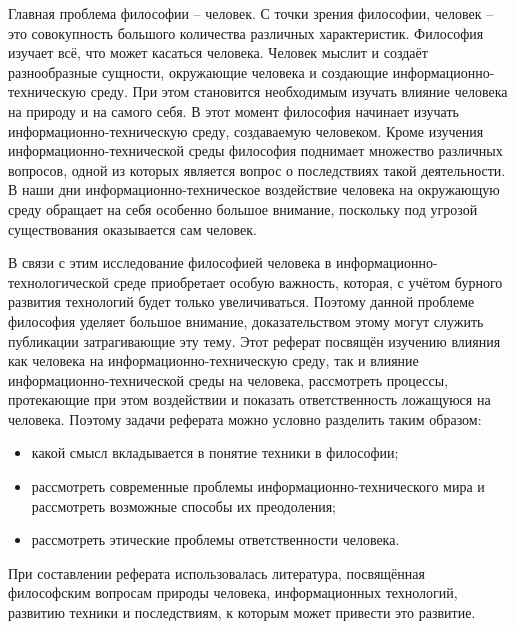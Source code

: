 

Главная проблема философии -- человек. С точки зрения философии, человек -- это совокупность большого количества различных характеристик. Философия изучает всё, что может касаться человека. Человек мыслит и создаёт разнообразные сущности, окружающие человека и создающие информационно-техническую среду. При этом становится необходимым изучать влияние человека на природу и на самого себя. В этот момент философия начинает изучать информационно-техническую среду, создаваемую человеком. Кроме изучения информационно-технической среды философия поднимает множество различных вопросов, одной из которых является вопрос о последствиях такой деятельности. В наши дни информационно-техническое воздействие человека на окружающую среду обращает на себя особенно большое внимание, поскольку под угрозой существования оказывается сам человек.





В связи с этим исследование философией человека в информационно-технологической среде приобретает особую важность, которая, с учётом бурного развития технологий будет только увеличиваться. Поэтому данной проблеме философия уделяет большое внимание, доказательством этому могут служить публикации затрагивающие эту тему.  Этот реферат посвящён изучению влияния как человека на информационно-техническую среду, так и влияние информационно-технической среды на человека, рассмотреть процессы, протекающие при этом воздействии и показать ответственность ложащуюся на человека. Поэтому задачи реферата можно условно разделить таким образом:

\begin{itemize}

\item{какой смысл вкладывается в понятие техники в философии;}

\item{рассмотреть современные проблемы информационно-технического мира и рассмотреть возможные способы их преодоления;}
  
\item{рассмотреть этические проблемы ответственности человека.}
\end{itemize}

При составлении реферата использовалась литература, посвящённая философским вопросам природы человека, информационных технологий, развитию техники и последствиям, к которым может привести это развитие.


\pagebreak

